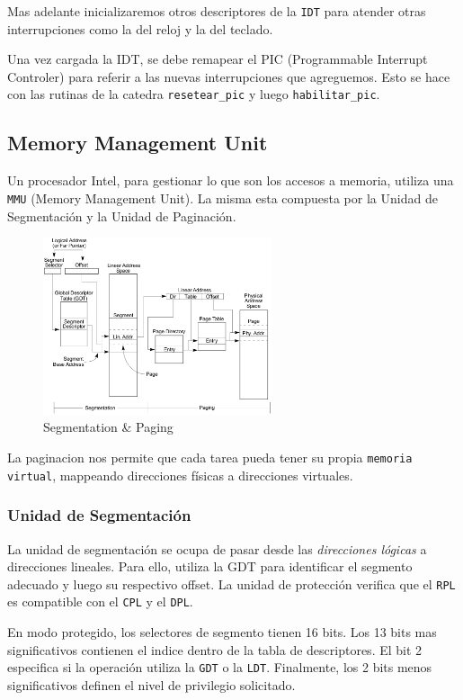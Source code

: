 Mas adelante inicializaremos otros descriptores de la \texttt{IDT} para atender otras interrupciones como la del reloj y la del teclado.

Una vez cargada la IDT, se debe remapear el PIC (Programmable Interrupt Controler) para referir a las nuevas interrupciones que agreguemos. Esto se hace con las rutinas de la catedra \texttt{resetear\_pic} y luego \texttt{habilitar\_pic}.

\subsection{Memory Management Unit}
Un procesador Intel, para gestionar lo que son los accesos a memoria, utiliza una \texttt{MMU} (Memory Management Unit). La misma esta compuesta por la Unidad de Segmentación y la Unidad de Paginación.

\begin{figure}[H]
  \centering
    \includegraphics[width=0.6\textwidth]{images/memory_management}
  \caption{Segmentation \& Paging}
\end{figure}

La paginacion nos permite que cada tarea pueda tener su propia \texttt{memoria virtual}, mappeando direcciones físicas a direcciones virtuales.

\subsubsection{Unidad de Segmentación}

La unidad de segmentación se ocupa de pasar desde las \textit{direcciones lógicas} a direcciones lineales. Para ello, utiliza la GDT para identificar el segmento adecuado y luego su respectivo offset. La unidad de protección verifica que el \texttt{RPL} es compatible con el \texttt{CPL} y el \texttt{DPL}.

En modo protegido, los selectores de segmento tienen 16 bits. Los 13 bits mas significativos contienen el indice dentro de la tabla de descriptores. El bit 2 especifica si la operación utiliza la \texttt{GDT} o la \texttt{LDT}. Finalmente, los 2 bits menos significativos definen el nivel de privilegio solicitado.

